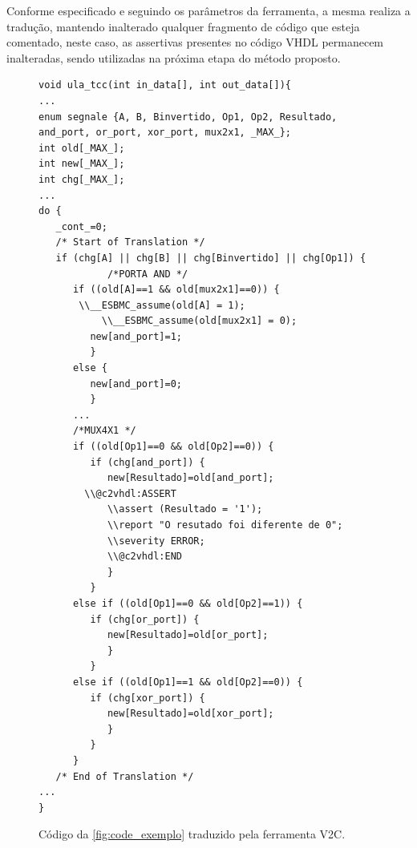 \par
Conforme especificado e seguindo os parâmetros da ferramenta, a mesma realiza a tradução, mantendo inalterado qualquer fragmento de código que esteja comentado, neste caso, as assertivas presentes no código VHDL permanecem inalteradas, sendo utilizadas na próxima etapa do método proposto.

\begin{figure}[H]
\caption{\label{fig:code_traduzido} Código da \autoref{fig:code_exemplo} traduzido pela ferramenta V2C.}
	\begin{center}
    \begin{minipage}{0.99\textwidth}
    \begin{lstlisting}      
void ula_tcc(int in_data[], int out_data[]){
...
enum segnale {A, B, Binvertido, Op1, Op2, Resultado, and_port, or_port, xor_port, mux2x1, _MAX_};
int old[_MAX_];
int new[_MAX_];
int chg[_MAX_];
...
do {
   _cont_=0;
   /* Start of Translation */
   if (chg[A] || chg[B] || chg[Binvertido] || chg[Op1]) {
            /*PORTA AND */
      if ((old[A]==1 && old[mux2x1]==0)) {
	   \\__ESBMC_assume(old[A] = 1);
           \\__ESBMC_assume(old[mux2x1] = 0);
         new[and_port]=1;
         }
      else {
         new[and_port]=0;
         }
      ...
      /*MUX4X1 */
      if ((old[Op1]==0 && old[Op2]==0)) {
         if (chg[and_port]) {
            new[Resultado]=old[and_port];
	    \\@c2vhdl:ASSERT
            \\assert (Resultado = '1');
            \\report "O resutado foi diferente de 0";
            \\severity ERROR;
            \\@c2vhdl:END
            }
         }
      else if ((old[Op1]==0 && old[Op2]==1)) {
         if (chg[or_port]) {
            new[Resultado]=old[or_port];
            }
         }
      else if ((old[Op1]==1 && old[Op2]==0)) {
         if (chg[xor_port]) {
            new[Resultado]=old[xor_port];
            }
         }
      }
   /* End of Translation */
...
}
    \end{lstlisting}
    \end{minipage}
	\end{center}
\end{figure}

